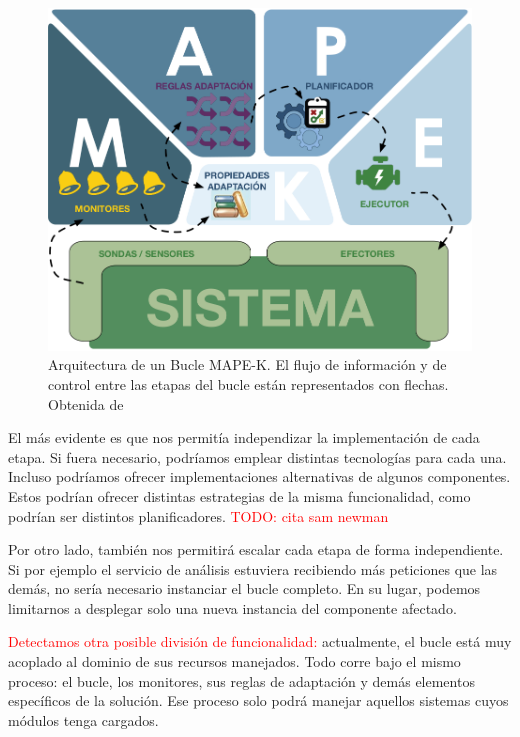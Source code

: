 \begin{figure}[htb]
  \centering
  \includegraphics[scale=1.15]{cap_introduccion/images/bucle-mape-k}
  \caption[Arquitectura de un Bucle MAPE-K. El flujo de información y de control entre las etapas del bucle están representados con flechas.]{Arquitectura de un Bucle MAPE-K. El flujo de información y de control entre las etapas del bucle están representados con flechas. Obtenida de \cite{fonsEspecificacionSistemasAutoadaptativos2021}}
  \label{fig:bucle-mapek2}
\end{figure}

El más evidente es que nos permitía independizar la implementación de cada etapa. Si fuera necesario, podríamos emplear distintas tecnologías para cada una. Incluso podríamos ofrecer implementaciones alternativas de algunos componentes. Estos podrían ofrecer distintas estrategias de la misma funcionalidad, como podrían ser distintos planificadores. \textcolor{red}{TODO: cita sam newman}

Por otro lado, también nos permitirá escalar cada etapa de forma independiente. Si por ejemplo el servicio de análisis estuviera recibiendo más peticiones que las demás, no sería necesario instanciar el bucle completo. En su lugar, podemos limitarnos a desplegar solo una nueva instancia del componente afectado.

\textcolor{red}{Detectamos otra posible división de funcionalidad:} actualmente, el bucle está muy acoplado al dominio de sus recursos manejados. Todo corre bajo el mismo proceso: el bucle, los monitores, sus reglas de adaptación y demás elementos específicos de la solución. Ese proceso solo podrá manejar aquellos sistemas cuyos módulos tenga cargados.

